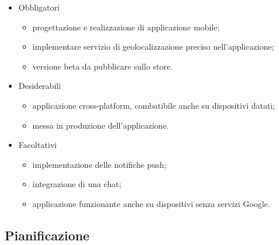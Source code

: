 \begin{itemize}
	\item Obbligatori
	\begin{itemize}
		\item progettazione e realizzazione di applicazione mobile;
    \item implementare servizio di geolocalizzazione preciso nell’applicazione;
    \item versione beta da pubblicare sullo store.
	\end{itemize}

	\item Desiderabili
	\begin{itemize}
		\item applicazione cross-platform, combatibile anche su dispositivi datati;
    \item messa in produzione dell’applicazione.
	\end{itemize}

	\item Facoltativi
	\begin{itemize}
		\item implementazione delle notifiche push;
    \item integrazione di una chat;
    \item applicazione funzionante anche su dispositivi senza servizi Google.
	\end{itemize}
\end{itemize}

\subsection{Pianificazione}

